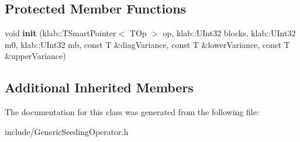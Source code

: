 \subsection*{Protected Member Functions}
\begin{DoxyCompactItemize}
\item 
void {\bfseries init} (klab\+::\+T\+Smart\+Pointer$<$ T\+Op $>$ op, klab\+::\+U\+Int32 blocks, klab\+::\+U\+Int32 m0, klab\+::\+U\+Int32 mb, const T \&diag\+Variance, const T \&lower\+Variance, const T \&upper\+Variance)\hypertarget{classkl1p_1_1TGenericSeedingOperator_ab71f886e27c47e79de5561db5ada6174}{}\label{classkl1p_1_1TGenericSeedingOperator_ab71f886e27c47e79de5561db5ada6174}

\end{DoxyCompactItemize}
\subsection*{Additional Inherited Members}


The documentation for this class was generated from the following file\+:\begin{DoxyCompactItemize}
\item 
include/Generic\+Seeding\+Operator.\+h\end{DoxyCompactItemize}
